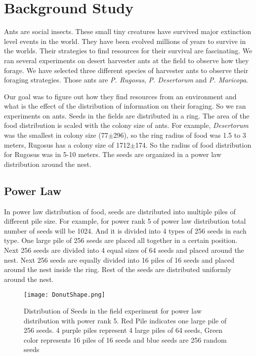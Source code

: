 \chapter{Background Study}
Ants are social insects. These small tiny creatures have survived major extinction level events in the world. They have been evolved millions of years to survive in the worlds. Their strategies to find resources for their survival are fascinating. We ran several experiments on desert harvester ants at the field to observe how they forage. We have selected three different species of harvester ants to observe their foraging strategies. Those ants are \textit{P. Rugosus}, \textit{P. Desertorum} and \textit{P. Maricopa}.\par
Our goal was to figure out how they find resources from an environment and what is the effect of the distribution of information on their foraging. So we ran experiments on ants. Seeds in the fields are distributed in a  ring. The area of the food distribution is scaled with the colony size of ants. For example, \textit{Desertorum} was the smallest in colony size (77$\pm$296), so the  ring radius of food was 1.5 to 3 meters, Rugosus has a colony size of 1712$\pm$174. So the radius of food distribution for Rugosus was in 5-10 meters. The seeds are organized in a power law distribution around the nest.
\section{\label{section:Power Law}Power Law}
In power law distribution of food, seeds are distributed into multiple piles of different pile size. For example, for power rank 5 of power law distribution total number of seeds will be 1024. And it is divided into 4 types of 256 seeds in each type. One large pile of 256 seeds are placed all together in a certain position. Next 256 seeds are divided into 4 equal sizes of 64 seeds and placed around the nest. Next 256 seeds are equally divided into 16 piles of 16 seeds and placed around the nest inside the ring. Rest of the seeds are distributed uniformly around the nest.
\begin{figure}[h]
	\texttt{[image: DonutShape.png]}
	\caption{Distribution of Seeds in the field experiment for power law distribution with power rank 5. Red Pile indicates one large pile of 256 seeds. 4 purple piles represent 4 large piles of 64 seeds, Green color represents 16 piles of 16 seeds and blue seeds are 256 random seeds}
\end{figure}
